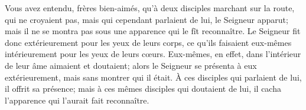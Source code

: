 Vous avez entendu, frères bien-aimés,
	qu’à deux disciples marchant sur la route,
	qui ne croyaient pas, mais qui cependant parlaient de lui,
	le Seigneur apparut;
	mais il ne se montra pas sous une apparence qui le fît reconnaître.
Le Seigneur fit donc extérieurement pour les yeux de leurs corps,
	ce qu’ils faisaient eux-mêmes intérieurement pour les yeux de leurs cœurs.
Eux-mêmes, en effet, dans l’intérieur de leur âme aimaient et doutaient;
	alors le Seigneur se présenta à eux extérieurement,
	mais sans montrer qui il était.
À ces disciples qui parlaient de lui, il offrit sa présence;
	mais à ces mêmes disciples qui doutaient de lui,
	il cacha l’apparence qui l’aurait fait reconnaître.
